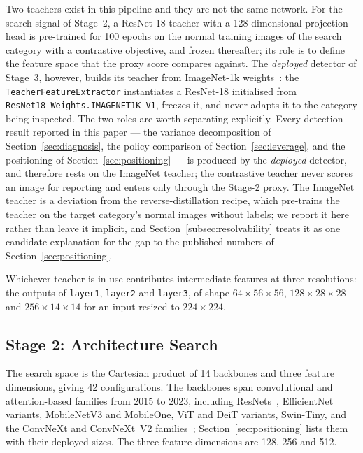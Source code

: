 Two teachers exist in this pipeline and they are not the same network. For the
search signal of Stage~2, a ResNet-18 teacher with a 128-dimensional projection
head is pre-trained for 100 epochs on the normal training images of the search
category
with a contrastive objective, and frozen thereafter; its role is to define the
feature space that the proxy score compares against. The \emph{deployed} detector
of Stage~3, however, builds its teacher from
ImageNet-1k weights~\cite{deng2022reverse,he2016deep}: the
\texttt{TeacherFeatureExtractor} instantiates a ResNet-18 initialised from
\texttt{ResNet18\_Weights.IMAGENET1K\_V1}, freezes it, and never adapts it to the
category being inspected. The two roles are worth separating explicitly. Every
detection result reported in this paper --- the variance decomposition of
Section~\ref{sec:diagnosis}, the policy comparison of Section~\ref{sec:leverage},
and the positioning of Section~\ref{sec:positioning} --- is produced by the
\emph{deployed} detector, and therefore rests on the ImageNet teacher; the
contrastive teacher never scores an image for reporting and enters only through the
Stage-2 proxy. The ImageNet teacher is a deviation from the reverse-distillation
recipe, which pre-trains the teacher on the target category's normal images
without labels; we report it here rather than leave it implicit, and
Section~\ref{subsec:resolvability} treats it as one candidate explanation for the
gap to the published numbers of Section~\ref{sec:positioning}.

Whichever teacher is in use contributes intermediate features at three
resolutions: the outputs of \texttt{layer1}, \texttt{layer2} and \texttt{layer3},
of shape $64\times56\times56$, $128\times28\times28$ and $256\times14\times14$ for
an input resized to $224\times224$.

\subsection{Stage 2: Architecture Search}
\label{subsec:nas}

The search space is the Cartesian product of 14 backbones and three feature
dimensions, giving 42 configurations. The backbones span convolutional and
attention-based families from 2015 to 2023, including
ResNets~\cite{he2016deep}, EfficientNet variants, MobileNetV3 and MobileOne, ViT
and DeiT variants, Swin-Tiny, and the ConvNeXt and ConvNeXt~V2
families~\cite{woo2023convnextv2}; Section~\ref{sec:positioning} lists them with
their deployed sizes. The three feature dimensions are 128, 256 and 512.

